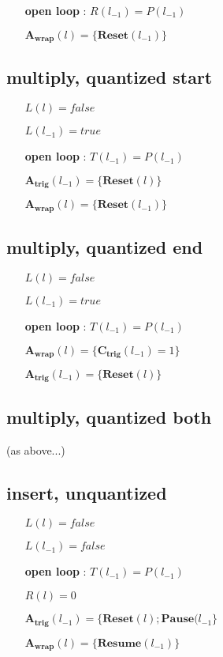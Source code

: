 \documentclass{article}
\begin{document}
\begin{itemize}
\item[\textbf{open loop}]: $R(l_{-1}) = P(l_{-1})$
\item[] $\mathbf{A_{wrap}}(l) = \{\mathbf{Reset}(l_{-1})\}$
\end{itemize}

\subsection[mul-quantA]{multiply, quantized start}
\begin{itemize}
\item[] $L(l) = false$
\item[] $L(l_{-1}) = true$
\item[\textbf{open loop}]: $T(l_{-1}) = P(l_{-1})$
\item[] $\mathbf{A_{trig}}(l_{-1}) = \{\mathbf{Reset}(l)\}$
\item[] $\mathbf{A_{wrap}}(l) = \{\mathbf{Reset}(l_{-1})\}$
\end{itemize}

\subsection[mul-quantB]{multiply, quantized end}

\begin{itemize}
\item[] $L(l) = false$
\item[] $L(l_{-1}) = true$
\item[\textbf{open loop}]: $T(l_{-1}) = P(l_{-1})$
\item[] $\mathbf{A_{wrap}}(l) = \{\mathbf{C_{trig}}(l_{-1}) = 1\}$
\item[] $\mathbf{A_{trig}}(l_{-1}) = \{\mathbf{Reset}(l)\}$
\end{itemize}

\subsection[mul-quantAB]{multiply, quantized both}

(as above...)

\subsection[insert-unquant]{insert, unquantized}

\begin{itemize}
\item[] $L(l) = false$
\item[] $L(l_{-1}) = false$
\item[\textbf{open loop}]: $T(l_{-1}) = P(l_{-1})$
\item[] $R(l) = 0$
\item[] $\mathbf{A_{trig}}(l_{-1}) = \{\mathbf{Reset}(l); \mathbf{Pause}(l_{-1}\}$
\item[] $\mathbf{A_{wrap}}(l) = \{\mathbf{Resume}(l_{-1})\}$
\end{itemize}
    
\end{document}
